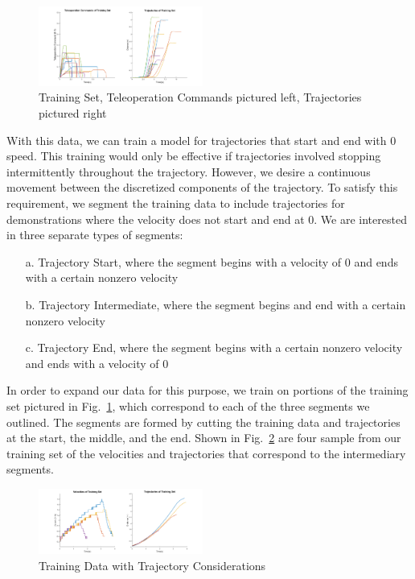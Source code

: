 \documentclass[letterpaper, 10 pt, conference]{ieeeconf}  %
\newcommand\NB[1]{$\spadesuit$\footnote{NB: #1}}
\begin{document}
\begin{figure}[ht]
    \includegraphics[width=0.48\textwidth]{images/training.png}
    \caption{Training Set, Teleoperation Commands pictured left, Trajectories pictured right}
    \label{fig:train}
\end{figure}

With this data, we can train a model for trajectories that start and end with $0$ speed. This training would only be effective if trajectories involved stopping intermittently throughout the trajectory. However, we desire a continuous movement between the discretized components of the trajectory. To satisfy this requirement, we segment the training data to include trajectories for demonstrations where the velocity does not start and end at $0$. We are interested in three separate types of segments:
\begin{itemize}
    \item[a.] Trajectory Start, where the segment begins with a velocity of $0$ and ends with a certain nonzero velocity
    \item[b.] Trajectory Intermediate, where the segment begins and end with a certain nonzero velocity
    \item[c.] Trajectory End, where the segment begins with a certain nonzero velocity and ends with a velocity of $0$
\end{itemize}
In order to expand our data for this purpose, we train on portions of the training set pictured in Fig.~\ref{fig:train}, which correspond to each of the three segments we outlined. The segments are formed by cutting the training data and trajectories at the start, the middle, and the end. Shown in Fig.~\ref{fig:trainelab} are four sample from our training set of the velocities and trajectories that correspond to the intermediary segments.
\begin{figure}[h]
	\includegraphics[width=0.48\textwidth]{images/inttrain.png}
	\caption{Training Data with Trajectory Considerations}
	\label{fig:trainelab}
\end{figure}
\end{document}
